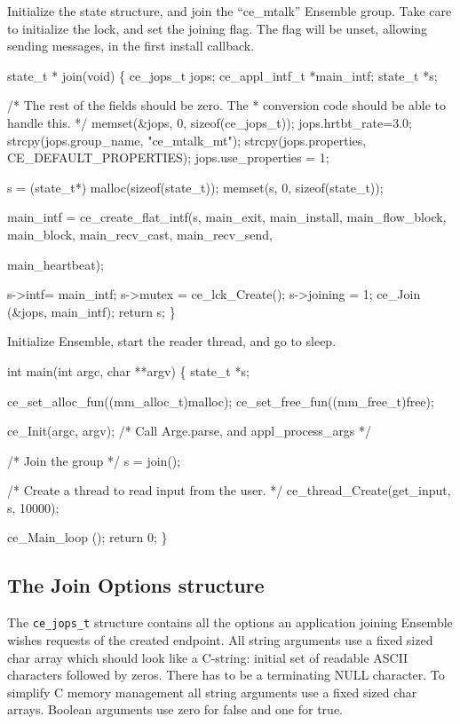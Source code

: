 Initialize the state structure, and join the ``ce\_mtalk'' Ensemble group.
Take care to initialize the lock, and set the joining flag. The flag
will be unset, allowing sending messages, in the first install callback.
\begin{codebox}
state_t *
join(void)
\{
    ce_jops_t jops; 
    ce_appl_intf_t *main_intf;
    state_t *s;
    
    /* The rest of the fields should be zero. The
     * conversion code should be able to handle this. 
     */
    memset(&jops, 0, sizeof(ce_jops_t));
    jops.hrtbt_rate=3.0;
    strcpy(jops.group_name, "ce_mtalk_mt");
    strcpy(jops.properties, CE_DEFAULT_PROPERTIES);
    jops.use_properties = 1;
    
    s = (state_t*) malloc(sizeof(state_t));
    memset(s, 0, sizeof(state_t));
    
    main_intf = ce_create_flat_intf(s,
				    main_exit, main_install, main_flow_block,
				    main_block, main_recv_cast, main_recv_send,
				    
				    main_heartbeat);
    
    s->intf= main_intf;
    s->mutex = ce_lck_Create();
    s->joining = 1;
    ce_Join (&jops, main_intf);
    return s;
\}
\end{codebox}


Initialize Ensemble, start the reader thread, and go to sleep.
\begin{codebox}
int
main(int argc, char **argv)
\{
    state_t *s;
    
    ce_set_alloc_fun((mm_alloc_t)malloc);
    ce_set_free_fun((mm_free_t)free);

    ce_Init(argc, argv); /* Call Arge.parse, and appl_process_args */

    /* Join the group
     */
    s = join();
    
    /* Create a thread to read input from the user.
     */
    ce_thread_Create(get_input, s, 10000);
    
    ce_Main_loop ();
    return 0;
\}
\end{codebox}

\subsection{The Join Options structure}
The {\tt ce\_jops\_t} structure contains all the options an application
joining Ensemble wishes requests of the created endpoint. All string
arguments use a fixed sized char array which should look like a
C-string: initial set of readable ASCII characters followed by zeros. 
There has to be a terminating NULL character. To simplify C memory
management all string arguments use a fixed sized char arrays.
Boolean arguments use zero for false and one for true. 

